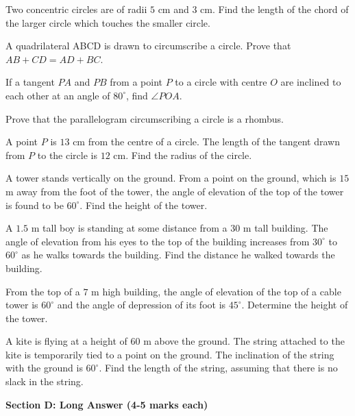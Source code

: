 \documentclass[12pt,a4paper]{exam}
\begin{document}
\begin{questions}
\question[3] Two concentric circles are of radii $5 \text{ cm}$ and $3 \text{ cm}$. Find the length of the chord of the larger circle which touches the smaller circle.
\vspace{0.15cm}

\question[3] A quadrilateral ABCD is drawn to circumscribe a circle. Prove that $AB + CD = AD + BC$.
\vspace{0.15cm}

\question[3] If a tangent $PA$ and $PB$ from a point $P$ to a circle with centre $O$ are inclined to each other at an angle of $80^{\circ}$, find $\angle POA$.
\vspace{0.15cm}

\question[3] Prove that the parallelogram circumscribing a circle is a rhombus.
\vspace{0.15cm}

\question[3] A point $P$ is $13 \text{ cm}$ from the centre of a circle. The length of the tangent drawn from $P$ to the circle is $12 \text{ cm}$. Find the radius of the circle.
\vspace{0.15cm}

\question[3] A tower stands vertically on the ground. From a point on the ground, which is $15$ m away from the foot of the tower, the angle of elevation of the top of the tower is found to be $60^\circ$. Find the height of the tower.
\vspace{0.15cm}

\question[3] A $1.5$ m tall boy is standing at some distance from a $30$ m tall building. The angle of elevation from his eyes to the top of the building increases from $30^\circ$ to $60^\circ$ as he walks towards the building. Find the distance he walked towards the building.
\vspace{0.15cm}

\question[3] From the top of a $7$ m high building, the angle of elevation of the top of a cable tower is $60^\circ$ and the angle of depression of its foot is $45^\circ$. Determine the height of the tower.
\vspace{0.15cm}

\question[3] A kite is flying at a height of $60$ m above the ground. The string attached to the kite is temporarily tied to a point on the ground. The inclination of the string with the ground is $60^\circ$. Find the length of the string, assuming that there is no slack in the string.
\vspace{0.15cm}

\end{questions}
\bigskip
\noindent\textbf{\large Section D: Long Answer (4-5 marks each)}
\end{document}
